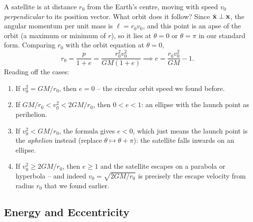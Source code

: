 \documentclass[a4paper]{scrartcl}
\begin{document}
\begin{center}
\end{center}

\begin{example}
	A satellite is at distance $r_0$ from the Earth's centre, moving with speed $v_0$ \emph{perpendicular} to its position vector. What orbit does it follow? Since $\dot{\mathbf{x}} \perp \mathbf{x}$, the angular momentum per unit mass is $\ell = r_0 v_0$, and this point is an apse of the orbit (a maximum or minimum of $r$), so it lies at $\theta = 0$ or $\theta = \pi$ in our standard form. Comparing $r_0$ with the orbit equation at $\theta = 0$,
	$$
	r_0 = \frac{p}{1 + e} = \frac{r_0^2 v_0^2}{GM(1 + e)} \implies e = \frac{r_0 v_0^2}{GM} - 1.
	$$
	Reading off the cases:
	\begin{enumerate}[label=(\roman*)]
		\item If $v_0^2 = GM/r_0$, then $e = 0$ -- the circular orbit speed we found before.
		\item If $GM/r_0 < v_0^2 < 2GM/r_0$, then $0 < e < 1$: an ellipse with the launch point as perihelion.
		\item If $v_0^2 < GM/r_0$, the formula gives $e < 0$, which just means the launch point is the \emph{aphelion} instead (replace $\theta \mapsto \theta + \pi$): the satellite falls inwards on an ellipse.
		\item If $v_0^2 \geq 2GM/r_0$, then $e \geq 1$ and the satellite escapes on a parabola or hyperbola -- and indeed $v_0 = \sqrt{2GM/r_0}$ is precisely the escape velocity from radius $r_0$ that we found earlier.
	\end{enumerate}
\end{example}

\subsection{Energy and Eccentricity}
\end{document}
